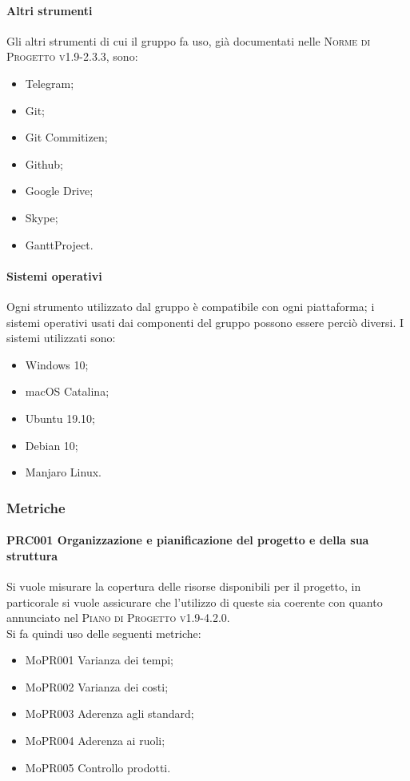 \paragraph{Altri strumenti}
Gli altri strumenti di cui il gruppo fa uso, già documentati nelle \textsc{Norme di Progetto v1.9-2.3.3}, sono:
\begin{itemize}
  \item Telegram;
  \item Git;
  \item Git Commitizen;
  \item Github;
  \item Google Drive;
  \item Skype;
  \item GanttProject.
\end{itemize}

\paragraph{Sistemi operativi}
Ogni strumento utilizzato dal gruppo è compatibile con ogni piattaforma; i sistemi operativi usati dai componenti del gruppo possono essere perciò diversi. I sistemi utilizzati sono:
\begin{itemize}
  \item Windows 10;
  \item macOS Catalina;
  \item Ubuntu 19.10;
  \item Debian 10;
  \item Manjaro Linux.
\end{itemize}

\subsubsection{Metriche}
\paragraph{PRC001 Organizzazione e pianificazione del progetto e della sua struttura}
Si vuole misurare la copertura delle risorse disponibili per il progetto, in particorale si vuole assicurare che l'utilizzo di queste sia coerente con quanto annunciato nel \textsc{Piano di Progetto v1.9-4.2.0}. \\
Si fa quindi uso delle seguenti metriche:
\begin{itemize}
  \item MoPR001 Varianza dei tempi;
  \item MoPR002 Varianza dei costi;
  \item MoPR003 Aderenza agli standard;
  \item MoPR004 Aderenza ai ruoli;
  \item MoPR005 Controllo prodotti.
\end{itemize}

